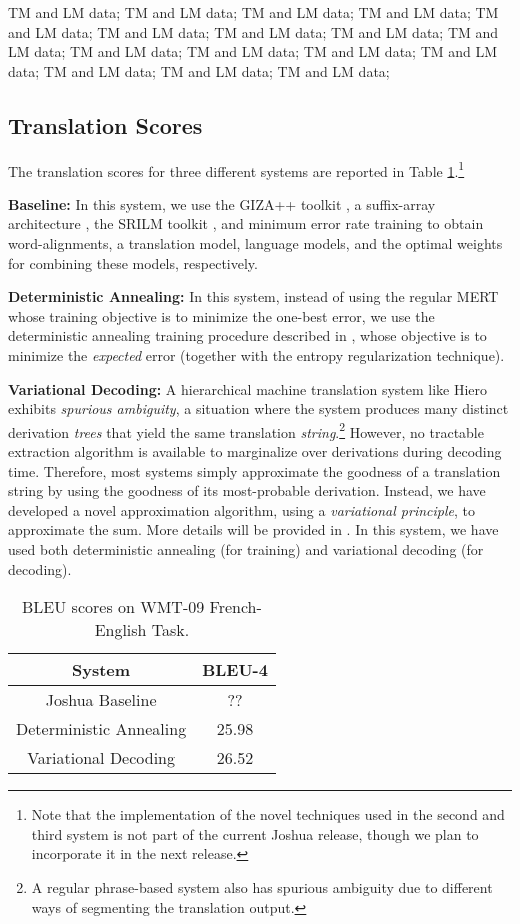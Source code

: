 \documentclass[11pt]{article}
\begin{document}
TM and LM data; TM and LM data; TM and LM data; TM and LM data; TM and LM data; TM and LM data; TM and LM data; TM and LM data; TM and LM data; TM and LM data; TM and LM data; TM and LM data; TM and LM data; TM and LM data; TM and LM data; TM and LM data;


\subsection{Translation Scores}
The translation scores for three different systems are reported in Table \ref{results-wmt09}.\footnote{Note that the implementation of the novel techniques used in the second and third system is not part of the current Joshua release, though we plan to incorporate it in the next release.}


\textbf{Baseline: } In this system, we use the GIZA++ toolkit \cite{Och2003}, a suffix-array architecture \cite{Lopez2007}, the SRILM toolkit \cite{Stolcke2002}, and minimum error rate training \cite{Och2003c} to obtain word-alignments, a translation model, language models, and the optimal weights for combining these models, respectively.

\textbf{Deterministic Annealing: } In this system, instead of using the regular MERT \cite{Och2003c} whose training objective is to minimize the one-best error, we use the deterministic annealing training procedure described in , whose objective is to minimize the \emph{expected} error (together with the entropy regularization technique).

\textbf{Variational Decoding: }  A hierarchical machine translation system like Hiero exhibits \emph{spurious ambiguity}, a situation where the system
produces many distinct derivation \emph{trees} that yield the same translation \emph{string}.\footnote{A regular phrase-based system also has spurious ambiguity due to different ways of segmenting the translation output.} However, no tractable extraction algorithm is available to marginalize over derivations during decoding time. Therefore, most systems simply approximate the goodness of a translation string by using the goodness of its most-probable derivation. Instead, we have developed a novel approximation algorithm, using a \emph{variational principle}, to approximate the sum.
More details will be provided in . In this system, we have used both deterministic annealing (for training) and variational decoding (for decoding).



\begin{table}[t]
\begin{center}
\begin{tabular}{c c}\hline
System & BLEU-4 \\ \hline
Joshua Baseline & ?? \\
Deterministic Annealing & 25.98 \\
Variational Decoding & 26.52 \\ \hline
\end{tabular}
\end{center}
\caption{BLEU scores on WMT-09 French-English Task.}
\label{results-wmt09}
\end{table}
\end{document}
